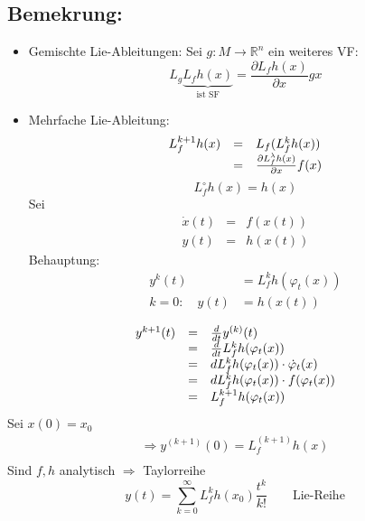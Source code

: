 \documentclass[ngerman]{tudscrreprt}
\begin{document}
\subsection*{Bemekrung:}
\begin{itemize}
\item Gemischte Lie-Ableitungen: Sei $g: M \to \mathbb{R}^{n}$ ein weiteres VF:
\begin{equation*}
L_g \underbrace{L_f h(x)}_{\text{ist SF}} = \frac{\partial L_f h(x)}{\partial x} gx
\end{equation*}
\item Mehrfache Lie-Ableitung:
\begin{equation*}
\begin{array}{ l l l}
L_f^{k+1}h(x) &=& L_f(L_f^k h(x))\\ &=& \frac{\partial L_f^{\lambda} h(x)}{\partial x}f(x)
\end{array}
\end{equation*}
\begin{equation*}
L_f^{\circ}h(x) = h(x)
\end{equation*}
Sei \begin{equation*}
\begin{matrix}
\dot x(t) &=&f(x(t))\\ 
y(t) &=&h(x(t)) 
\end{matrix}
\end{equation*}
Behauptung: 
\begin{align*}
y^{k}(t) &= L_f^k h(\varphi_t(x))\\ 
k=0: \quad y(t) &= h(x(t))
\end{align*}
\end{itemize}
\begin{equation*}
\begin{array}{l l l}
y^{k+1}(t) &=&\frac{d}{dt}y^{(k)}(t) \\ 
&=&\frac{d}{dt}L_f^{k}h(\varphi_t(x))\\ 
&=&dL_f^k h(\varphi_t(x))\cdot \dot \varphi_t(x)\\ 
&=&dL_f^k h(\varphi_t(x))\cdot f (\varphi_t(x))\\ 
&=&L_f^{k+1} h(\varphi_t(x))
\end{array}
\end{equation*}
Sei $x(0) = x_0$
\begin{align*}
\Rightarrow y^{(k+1)} (0) = L_f^{(k+1)} h(x)\\ 
\end{align*}
Sind $f,h$ analytisch $\Rightarrow$ Taylorreihe
\begin{equation*}
y(t) = \sum\limits_{k=0}^{\infty} L_f^k h(x_0)\frac{t^k}{k!} \qquad \text{Lie-Reihe}
\end{equation*}
\end{document}

